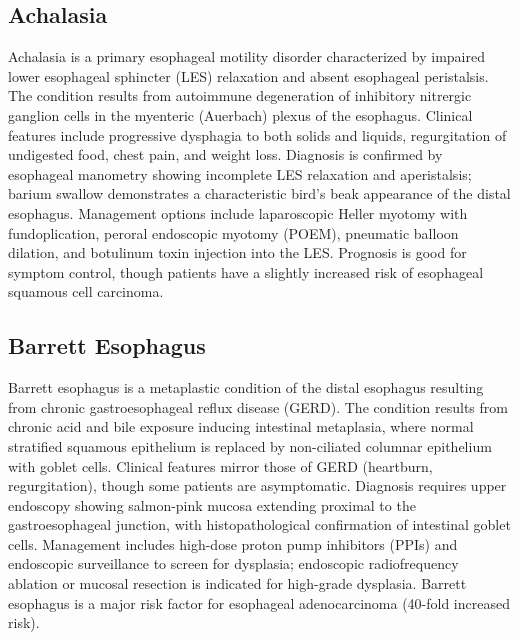 \subsection{Achalasia}
\label{sec:Achalasia}
Achalasia is a primary esophageal motility disorder characterized by impaired lower esophageal sphincter (LES) relaxation and absent esophageal peristalsis. The condition results from autoimmune degeneration of inhibitory nitrergic ganglion cells in the myenteric (Auerbach) plexus of the esophagus. Clinical features include progressive dysphagia to both solids and liquids, regurgitation of undigested food, chest pain, and weight loss. Diagnosis is confirmed by esophageal manometry showing incomplete LES relaxation and aperistalsis; barium swallow demonstrates a characteristic bird's beak appearance of the distal esophagus. Management options include laparoscopic Heller myotomy with fundoplication, peroral endoscopic myotomy (POEM), pneumatic balloon dilation, and botulinum toxin injection into the LES. Prognosis is good for symptom control, though patients have a slightly increased risk of esophageal squamous cell carcinoma.


\subsection{Barrett Esophagus}
\label{sec:Barrett Esophagus}
Barrett esophagus is a metaplastic condition of the distal esophagus resulting from chronic gastroesophageal reflux disease (GERD). The condition results from chronic acid and bile exposure inducing intestinal metaplasia, where normal stratified squamous epithelium is replaced by non-ciliated columnar epithelium with goblet cells. Clinical features mirror those of GERD (heartburn, regurgitation), though some patients are asymptomatic. Diagnosis requires upper endoscopy showing salmon-pink mucosa extending proximal to the gastroesophageal junction, with histopathological confirmation of intestinal goblet cells. Management includes high-dose proton pump inhibitors (PPIs) and endoscopic surveillance to screen for dysplasia; endoscopic radiofrequency ablation or mucosal resection is indicated for high-grade dysplasia. Barrett esophagus is a major risk factor for esophageal adenocarcinoma (40-fold increased risk).


